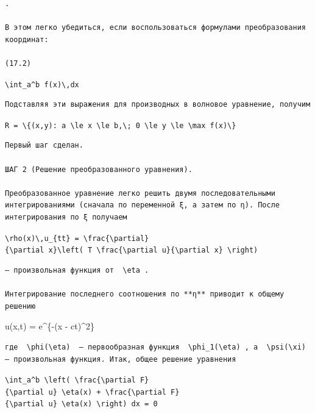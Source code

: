 \documentclass[
  ukrainian,
]{article}
\begin{document}
\begin{verbatim}
.

В этом легко убедиться, если воспользоваться формулами преобразования координат:

(17.2)
\end{verbatim}

\texttt{\textbackslash{}int\_a\^{}b\ f(x)\textbackslash{},dx}

\begin{verbatim}
Подставляя эти выражения для производных в волновое уравнение, получим
\end{verbatim}

\texttt{R\ =\ \textbackslash{}\{(x,y):\ a\ \textbackslash{}le\ x\ \textbackslash{}le\ b,\textbackslash{};\ 0\ \textbackslash{}le\ y\ \textbackslash{}le\ \textbackslash{}max\ f(x)\textbackslash{}\}}

\begin{verbatim}
Первый шаг сделан.

ШАГ 2 (Решение преобразованного уравнения).

Преобразованное уравнение легко решить двумя последовательными интегрированиями (сначала по переменной ξ, а затем по η). После интегрирования по ξ получаем
\end{verbatim}

\texttt{\textbackslash{}rho(x)\textbackslash{},u\_\{tt\}\ =\ \textbackslash{}frac\{\textbackslash{}partial\}\{\textbackslash{}partial\ x\}\textbackslash{}left(\ T\ \textbackslash{}frac\{\textbackslash{}partial\ u\}\{\textbackslash{}partial\ x\}\ \textbackslash{}right)}

\begin{verbatim}
— произвольная функция от  \eta .

Интегрирование последнего соотношения по **η** приводит к общему решению
\end{verbatim}

u(x,t) = e\^{}\{-(x - ct)\^{}2\}

\begin{verbatim}
где  \phi(\eta)  — первообразная функция  \phi_1(\eta) , а  \psi(\xi)  — произвольная функция. Итак, общее решение уравнения
\end{verbatim}

\texttt{\textbackslash{}int\_a\^{}b\ \textbackslash{}left(\ \textbackslash{}frac\{\textbackslash{}partial\ F\}\{\textbackslash{}partial\ u\}\ \textbackslash{}eta(x)\ +\ \textbackslash{}frac\{\textbackslash{}partial\ F\}\{\textbackslash{}partial\ u\textquotesingle{}\}\ \textbackslash{}eta\textquotesingle{}(x)\ \textbackslash{}right)\ dx\ =\ 0}
\end{document}
